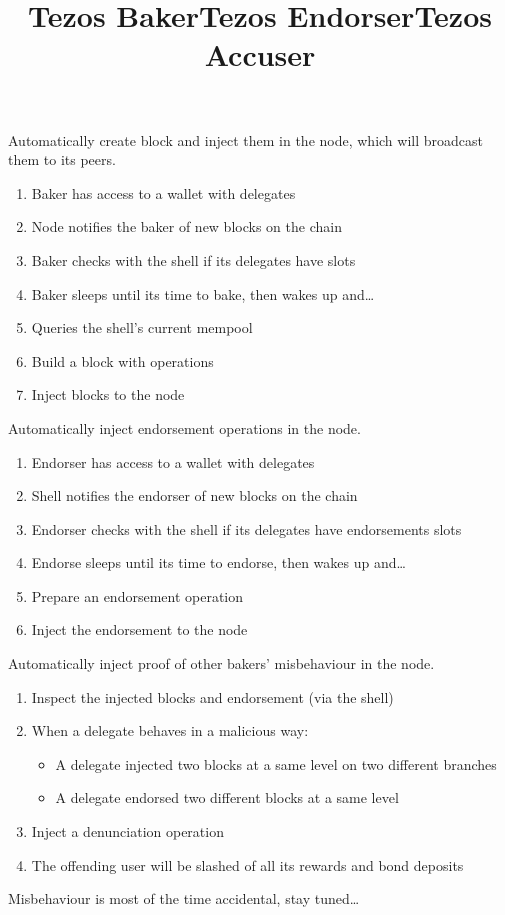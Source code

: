 \documentclass{slides}
\begin{document}
\begin{slide}
  \title{Tezos Baker}

  Automatically create block and inject them in the node, which
  will broadcast them to its peers.
  \bigskip

\begin{enumerate}
  \item Baker has access to a wallet with delegates
  \item Node notifies the baker of new blocks on the chain
  \item Baker checks with the shell if its delegates have slots
  \item Baker sleeps until its time to bake, then wakes up and…
  \item Queries the shell’s current mempool
  \item Build a block with operations
  \item Inject blocks to the node
  \end{enumerate}
\end{slide}

\begin{slide}
  \title{Tezos Endorser}

  Automatically inject endorsement operations in the node.
  \bigskip

\begin{enumerate}
\item Endorser has access to a wallet with delegates
\item Shell notifies the endorser of new blocks on the chain
\item Endorser checks with the shell if its delegates have endorsements slots
\item Endorse sleeps until its time to endorse, then wakes up and…
\item Prepare an endorsement operation
\item Inject the endorsement to the node
\end{enumerate}
\end{slide}

\begin{slide}
  \title{Tezos Accuser}

  Automatically inject proof of other bakers’ misbehaviour in the
  node.
  \bigskip

\begin{enumerate}
\item Inspect the injected blocks and endorsement (via the shell)
\item When a delegate behaves in a malicious way:
  \begin{itemize}
  \item A delegate injected two blocks at a same level on two
    different branches
  \item A delegate endorsed two different blocks at a same level
  \end{itemize}
\item Inject a denunciation operation
\item The offending user will be slashed of all its rewards and bond
  deposits
\end{enumerate}
\bigskip
Misbehaviour is most of the time accidental, stay tuned…
\end{slide}
\end{document}
